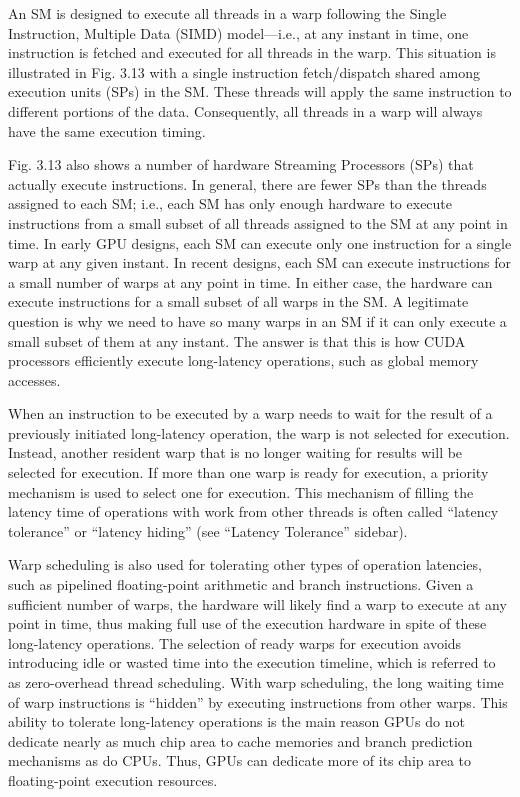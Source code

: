 \documentclass[11pt]{ctexart}
\begin{document}
An SM is designed to execute all threads in a warp following the Single
Instruction, Multiple Data (SIMD) model—i.e., at any instant in time, one instruction is fetched and executed for all threads in the warp. This situation is illustrated in Fig. 3.13 with a single instruction fetch/dispatch shared among execution units (SPs) in the SM. These threads will apply the same instruction to different portions of the data. Consequently, all threads in a warp will always have the same execution timing.

Fig. 3.13 also shows a number of hardware Streaming Processors (SPs) that actually execute instructions. In general, there are fewer SPs than the threads assigned to each SM; i.e., each SM has only enough hardware to execute instructions from a small subset of all threads assigned to the SM at any point in time. In early GPU designs, each SM can execute only one instruction for a single warp at any given instant. In recent designs, each SM can execute instructions for a small number of warps at any point in time. In either case, the hardware can execute instructions for a small subset of all warps in the SM. A legitimate question is why we need to have so many warps in an SM if it can only execute a small subset of them at any instant. The answer is that this is how CUDA processors efficiently execute long-latency operations, such as global memory accesses.

When an instruction to be executed by a warp needs to wait for the result of a previously initiated long-latency operation, the warp is not selected for execution.
Instead, another resident warp that is no longer waiting for results will be selected for execution. If more than one warp is ready for execution, a priority mechanism is used to select one for execution. This mechanism of filling the latency time of operations with work from other threads is often called “latency tolerance” or “latency hiding” (see “Latency Tolerance” sidebar).

Warp scheduling is also used for tolerating other types of operation latencies, such as pipelined floating-point arithmetic and branch instructions. Given a sufficient number of warps, the hardware will likely find a warp to execute at any point in time, thus making full use of the execution hardware in spite of these long-latency operations. The selection of ready warps for execution avoids introducing idle or wasted time into the execution timeline, which is referred to as zero-overhead thread
scheduling. With warp scheduling, the long waiting time of warp instructions is “hidden” by executing instructions from other warps. This ability to tolerate long-latency operations is the main reason GPUs do not dedicate nearly as much chip area to cache memories and branch prediction mechanisms as do CPUs. Thus, GPUs can dedicate more of its chip area to floating-point execution resources.
\end{document}
